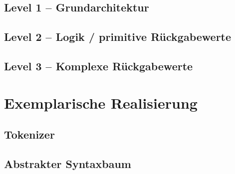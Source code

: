   \subsection{Level 1 -- Grundarchitektur}
  \label{ssec:Level 1 -- Grundarchitektur}
  \subsection{Level 2 -- Logik / primitive Rückgabewerte}
  \label{ssec:Level 2 -- Logik / primitive Rückgabewerte}

  \subsection{Level 3 -- Komplexe Rückgabewerte}
  \label{ssec:Level 3 -- Komplexe Rückgabewerte}

\section{Exemplarische Realisierung}
\label{sec:Exemplarische Realisierung}
  \subsection{Tokenizer}
  \label{ssec:Tokenizer}

  \subsection{Abstrakter Syntaxbaum}
  \label{ssec:Abstrakter Syntaxbaum}

